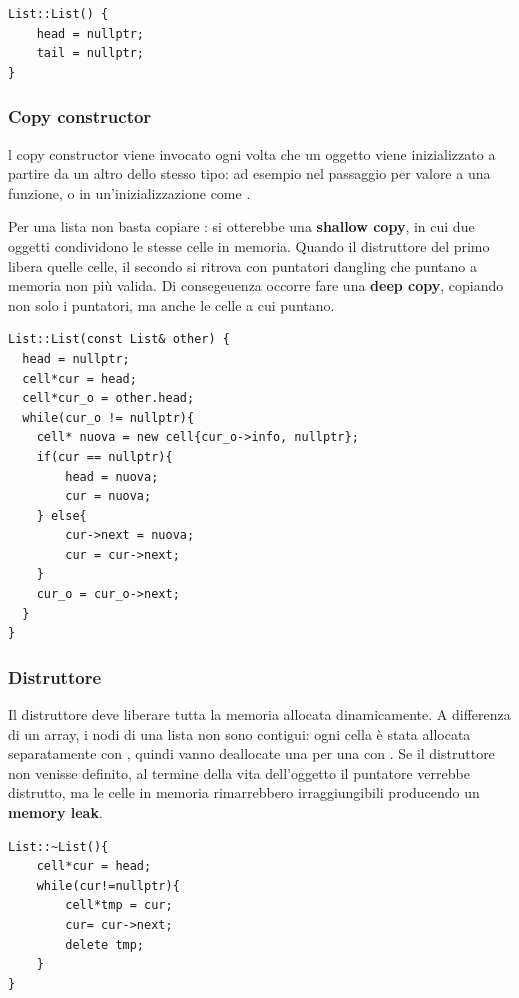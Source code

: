 \begin{codebox}
    \begin{lstlisting}
List::List() {
    head = nullptr;
    tail = nullptr;
}
    \end{lstlisting}
\end{codebox}

\subsubsection{Copy constructor}
l copy constructor viene invocato ogni volta che un oggetto viene inizializzato a partire da un altro dello stesso tipo: ad esempio nel passaggio per valore a una funzione, o in un'inizializzazione come .

Per una lista non basta copiare : si otterebbe una \textbf{shallow copy}, in cui due
oggetti condividono le stesse celle in memoria. Quando il distruttore del primo libera quelle celle, il secondo si ritrova  con
puntatori dangling che puntano a memoria non più valida. Di consegeuenza occorre fare una \textbf{deep copy}, copiando non solo i puntatori,
ma anche le celle a cui puntano.


\begin{codebox}
    \begin{lstlisting}
List::List(const List& other) {
  head = nullptr;
  cell*cur = head;
  cell*cur_o = other.head;
  while(cur_o != nullptr){
    cell* nuova = new cell{cur_o->info, nullptr};
    if(cur == nullptr){
        head = nuova;
        cur = nuova;
    } else{
        cur->next = nuova;
        cur = cur->next;
    }
    cur_o = cur_o->next;
  }
}
    \end{lstlisting}
\end{codebox}

\subsubsection{Distruttore}
Il distruttore deve liberare tutta la memoria allocata dinamicamente. A differenza di un array, i nodi di una lista non sono contigui: ogni cella è stata allocata separatamente con , quindi vanno deallocate una per una con . Se il distruttore non venisse definito, al termine della vita dell'oggetto il puntatore  verrebbe distrutto, ma le celle in memoria rimarrebbero irraggiungibili  producendo un \textbf{memory leak}.

\begin{codebox}
    \begin{lstlisting}
List::~List(){
    cell*cur = head;
    while(cur!=nullptr){
        cell*tmp = cur;
        cur= cur->next;
        delete tmp;
    }
}
    \end{lstlisting}
\end{codebox}

